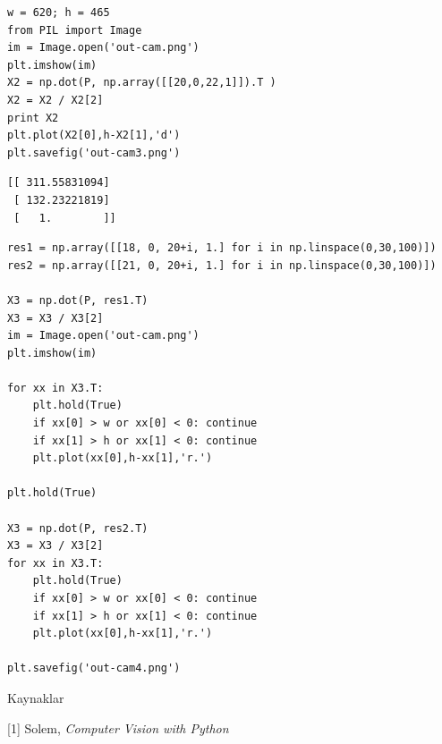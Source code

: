 \documentclass[12pt,fleqn]{article}\usepackage{../common}
\begin{document}
\begin{verbatim}
w = 620; h = 465
from PIL import Image
im = Image.open('out-cam.png')
plt.imshow(im)
X2 = np.dot(P, np.array([[20,0,22,1]]).T ) 
X2 = X2 / X2[2]
print X2
plt.plot(X2[0],h-X2[1],'d')
plt.savefig('out-cam3.png')
\end{verbatim}

\begin{verbatim}
[[ 311.55831094]
 [ 132.23221819]
 [   1.        ]]
\end{verbatim}

\begin{verbatim}
res1 = np.array([[18, 0, 20+i, 1.] for i in np.linspace(0,30,100)])
res2 = np.array([[21, 0, 20+i, 1.] for i in np.linspace(0,30,100)])

X3 = np.dot(P, res1.T)
X3 = X3 / X3[2]
im = Image.open('out-cam.png')
plt.imshow(im)

for xx in X3.T: 
    plt.hold(True)
    if xx[0] > w or xx[0] < 0: continue
    if xx[1] > h or xx[1] < 0: continue
    plt.plot(xx[0],h-xx[1],'r.')

plt.hold(True)

X3 = np.dot(P, res2.T)
X3 = X3 / X3[2]
for xx in X3.T: 
    plt.hold(True)
    if xx[0] > w or xx[0] < 0: continue
    if xx[1] > h or xx[1] < 0: continue
    plt.plot(xx[0],h-xx[1],'r.')

plt.savefig('out-cam4.png')
\end{verbatim}















Kaynaklar

[1] Solem, {\em Computer Vision with Python}
\end{document}
